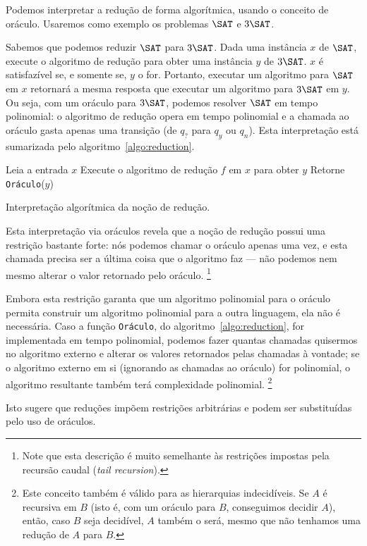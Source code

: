 Podemos interpretar a redução de forma algorítmica,
usando o conceito de oráculo.
Usaremos como exemplo os problemas $\SAT$ e $3\SAT$.

Sabemos que podemos reduzir $\SAT$ para $3\SAT$.
Dada uma instância $x$ de $\SAT$,
execute o algoritmo de redução para obter uma instância $y$ de $3\SAT$.
$x$ é satisfazível se, e somente se, $y$ o for.
Portanto, executar um algoritmo para $\SAT$ em $x$
retornará a mesma resposta
que executar um algoritmo para $3\SAT$ em $y$.
Ou seja, com um oráculo para $3\SAT$,
podemos resolver $\SAT$ em tempo polinomial:
o algoritmo de redução opera em tempo polinomial
e a chamada ao oráculo gasta apenas uma transição
(de $q_?$ para $q_y$ ou $q_n$).
Esta interpretação está sumarizada pelo algoritmo~\ref{algo:reduction}.

\begin{algorithm}[h]
    Leia a entrada $x$\;
    Execute o algoritmo de redução $f$ em $x$ para obter $y$\;
    Retorne \texttt{Oráculo}($y$)\;
    \caption{
        Interpretação algorítmica da noção de redução.
    }
    \label{algo:reduction}
\end{algorithm}

Esta interpretação via oráculos revela que
a noção de redução possui uma restrição bastante forte:
nós podemos chamar o oráculo apenas uma vez,
e esta chamada precisa ser a última coisa que o algoritmo faz
--- não podemos nem mesmo alterar o valor retornado pelo oráculo.%
\footnote{
    Note que esta descrição é muito semelhante
    às restrições impostas pela recursão caudal
    (\emph{tail recursion}).
}

Embora esta restrição garanta que
um algoritmo polinomial para o oráculo
permita construir um algoritmo polinomial para a outra linguagem,
ela não é necessária.
Caso a função \texttt{Oráculo}, do algoritmo~\ref{algo:reduction},
for implementada em tempo polinomial,
podemos fazer quantas chamadas quisermos no algoritmo externo
e alterar os valores retornados pelas chamadas à vontade;
se o algoritmo externo em si
(ignorando as chamadas ao oráculo)
for polinomial,
o algoritmo resultante também terá complexidade polinomial.%
\footnote{
    Este conceito também é válido para as hierarquias indecidíveis.
    Se $A$ é recursiva em $B$
    (isto é, com um oráculo para $B$, conseguimos decidir $A$),
    então, caso $B$ seja decidível,
    $A$ também o será,
    mesmo que não tenhamos uma redução de $A$ para $B$.
}

Isto sugere que reduções impõem restrições arbitrárias
e podem ser substituídas pelo uso de oráculos.
